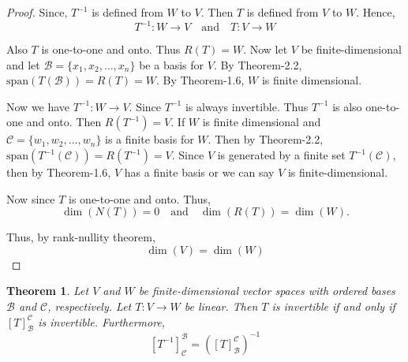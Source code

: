 \documentclass[12pt, a4paper]{article}
\newtheorem{theorem}{Theorem}[section]
\theoremstyle{definition}
\theoremstyle{remark}
\newcommand{\B}{\mathscr{B}}
\begin{document}
 \begin{proof}
     Since, $T^{-1}$ is defined from $W$ to $V$. Then $T$ is defined from $V$ to $W$. Hence,
     \[
     T^{-1}: W \to V \quad \text{and} \quad T: V \to W
     \]

     Also $T$ is one-to-one and onto. Thus $R(T) = W$. Now let $V$ be finite-dimensional and let $\B = \{x_1, x_2, \dots, x_n\}$ be a basis for $V$. By Theorem-2.2, $\text{span}(T(\B)) = R(T) = W$. By Theorem-1.6, $W$ is finite dimensional.

     Now we have $T^{-1}: W \to V$. Since $T^{-1}$ is always invertible. Thus $T^{-1}$ is also one-to-one and onto. Then $R(T^{-1}) = V$. If $W$ is finite dimensional and $\mathscr{C} = \{w_1, w_2, \dots, w_n\}$ is a finite basis for $W$. Then by Theorem-2.2, $\text{span}(T^{-1}(\mathscr{C})) = R(T^{-1}) = V$. Since $V$ is generated by a finite set $T^{-1}(\mathscr{C})$, then by Theorem-1.6, $V$ has a finite basis or we can say $V$ is finite-dimensional.

     Now since $T$ is one-to-one and onto. Thus,
     \[\dim(N(T)) = 0 \quad \text{and} \quad \dim(R(T)) = \dim(W).\]

     Thus, by rank-nullity theorem,
     \[\dim(V) = \dim(W)\]
 \end{proof}

 \begin{theorem}
     Let $V$ and $W$ be finite-dimensional vector spaces with ordered bases $\mathscr{B}$ and $\mathscr{C}$, respectively. Let $T: V \to W$ be linear. Then $T$ is invertible if and only if $[T]_{\mathscr{B}}^{\mathscr{C}}$ is invertible. Furthermore,
     $$[T^{-1}]_{\mathscr{C}}^{\mathscr{B}} = ([T]_{\mathscr{B}}^{\mathscr{C}})^{-1}$$
 \end{theorem}
\end{document}
